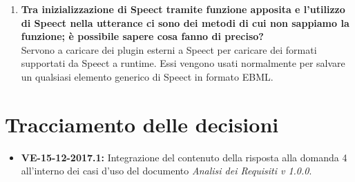 \documentclass[openany,12pt,a4paper]{article}
\begin{document}
\begin{enumerate}
	\item \textbf{Tra inizializzazione di Speect tramite funzione apposita e l'utilizzo di Speect nella utterance ci sono dei metodi di cui non sappiamo la funzione; è possibile sapere cosa fanno di preciso?}\\ Servono a caricare dei plugin esterni a Speect per caricare dei formati supportati da Speect a runtime. Essi vengono usati normalmente per salvare un qualsiasi elemento generico di Speect in formato EBML.

	\end{enumerate}
	
	\section{Tracciamento delle decisioni}
	
	\begin{itemize}
	    \item \textbf{VE-15-12-2017.1:} Integrazione del contenuto della risposta alla domanda 4 all'interno dei casi d'uso del documento \textit{Analisi dei Requisiti v 1.0.0}.
	\end{itemize}
	
	
\end{document}
